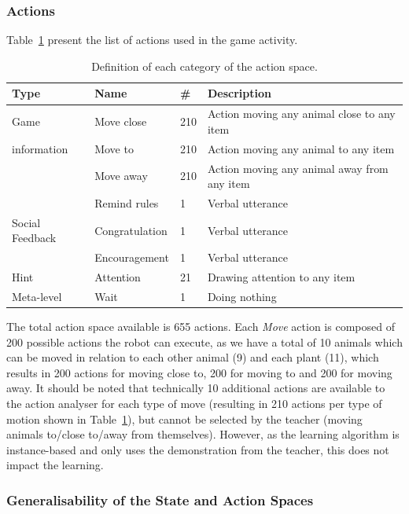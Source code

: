 \subsubsection{Actions}

Table~\ref{tab:tuto_actions_space} present the list of actions used in the game activity.

\begin{table}[ht]
	\centering
	\caption{Definition of each category of the action space.}
	\label{tab:tuto_actions_space}
	\begin{tabularx}{\textwidth}{@{}lllX@{}}\toprule
		Type & Name & \# & Description \\
		\midrule
		Game & Move close & 210 &  Action moving any animal close to any item\\
		information & Move to & 210 & Action moving any animal to any item\\
		& Move away & 210 & Action moving any animal away from any item\\
		& Remind rules & 1 & Verbal utterance\\
		Social Feedback & Congratulation & 1 & Verbal utterance\\
		& Encouragement & 1 & Verbal utterance\\
		Hint & Attention & 21 & Drawing attention to any item\\
		Meta-level & Wait & 1 & Doing nothing\\
		\bottomrule
	\end{tabularx}
\end{table}

The total action space available is 655 actions. Each \emph{Move} action is composed of 200 possible actions the robot can execute, as we have a total of 10 animals which can be moved in relation to each other animal (9) and each plant (11), which results in 200 actions for moving close to, 200 for moving to and 200 for moving away. It should be noted that technically 10 additional actions are available to the action analyser for each type of move (resulting in 210 actions per type of motion shown in Table~\ref{tab:tuto_actions_space}), but cannot be selected by the teacher (moving animals to/close to/away from themselves). However, as the learning algorithm is instance-based and only uses the demonstration from the teacher, this does not impact the learning. 

\subsubsection{Generalisability of the State and Action Spaces} \label{sec:tuto_general}

